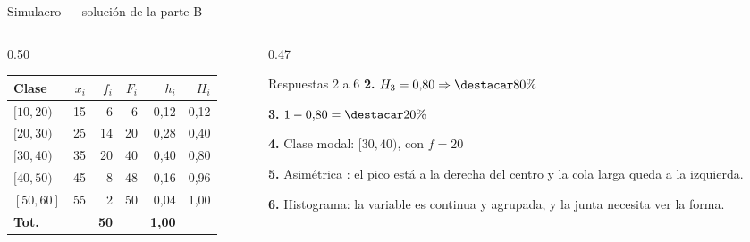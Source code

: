 \documentclass[aspectratio=169,10pt]{beamer}
\begin{document}
\begin{frame}{Simulacro — solución de la parte B}
  \scriptsize
  \begin{columns}[T,onlytextwidth]
    \begin{column}{0.50\textwidth}
      \centering
      \begin{tabular}{@{}lrrrrr@{}}
        \toprule
        \textbf{Clase} & \textbf{$x_i$} & \textbf{$f_i$} & \textbf{$F_i$} &
        \textbf{$h_i$} & \textbf{$H_i$} \\
        \midrule
        $[10,20)$ & 15 &  6 &  6 & 0{,}12 & 0{,}12 \\
        $[20,30)$ & 25 & 14 & 20 & 0{,}28 & 0{,}40 \\
        $[30,40)$ & 35 & 20 & 40 & 0{,}40 & 0{,}80 \\
        $[40,50)$ & 45 &  8 & 48 & 0{,}16 & 0{,}96 \\
        $[50,60]$ & 55 &  2 & 50 & 0{,}04 & 1{,}00 \\
        \midrule
        \textbf{Tot.} & & \textbf{50} & & \textbf{1{,}00} & \\
        \bottomrule
      \end{tabular}
    \end{column}
    \begin{column}{0.47\textwidth}
      \begin{exampleblock}{Respuestas 2 a 6}
        \scriptsize
        \textbf{2.} $H_3 = 0{,}80 \Rightarrow \destacar{80\%}$

        \textbf{3.} $1-0{,}80 = \destacar{20\%}$

        \textbf{4.} Clase modal: $[30,40)$, con $f=20$

        \textbf{5.} Asimétrica : el pico está a la derecha del
        centro y la cola larga queda a la izquierda.

        \textbf{6.} Histograma: la variable es continua y agrupada, y la junta
        necesita ver la forma.
      \end{exampleblock}
    \end{column}
  \end{columns}
\end{frame}
\end{document}
